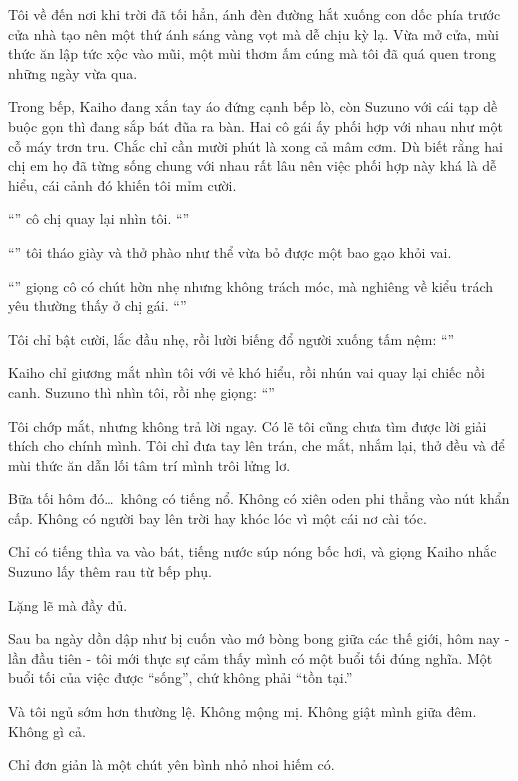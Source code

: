 \documentclass[../main.tex]{subfiles}
\begin{document}
Tôi về đến nơi khi trời đã tối hẳn, ánh đèn đường hắt xuống con dốc phía trước cửa nhà tạo nên một thứ ánh sáng vàng vọt mà dễ chịu kỳ lạ. Vừa mở cửa, mùi thức ăn lập tức xộc vào mũi, một mùi thơm ấm cúng mà tôi đã quá quen trong những ngày vừa qua.

Trong bếp, Kaiho đang xắn tay áo đứng cạnh bếp lò, còn Suzuno với cái tạp dề buộc gọn thì đang sắp bát đũa ra bàn. Hai cô gái ấy phối hợp với nhau như một cỗ máy trơn tru. Chắc chỉ cần mười phút là xong cả mâm cơm. Dù biết rằng hai chị em họ đã từng sống chung với nhau rất lâu nên việc phối hợp này khá là dễ hiểu, cái cảnh đó khiến tôi mỉm cười.

``'' cô chị quay lại nhìn tôi. ``''

``'' tôi tháo giày và thở phào như thể vừa bỏ được một bao gạo khỏi vai.

``'' giọng cô có chút hờn nhẹ nhưng không trách móc, mà nghiêng về kiểu trách yêu thường thấy ở chị gái. ``''

Tôi chỉ bật cười, lắc đầu nhẹ, rồi lười biếng đổ người xuống tấm nệm: ``''

Kaiho chỉ giương mắt nhìn tôi với vẻ khó hiểu, rồi nhún vai quay lại chiếc nồi canh. Suzuno thì nhìn tôi, rồi nhẹ giọng: ``''

Tôi chớp mắt, nhưng không trả lời ngay. Có lẽ tôi cũng chưa tìm được lời giải thích cho chính mình. Tôi chỉ đưa tay lên trán, che mắt, nhắm lại, thở đều và để mùi thức ăn dẫn lối tâm trí mình trôi lửng lơ.

Bữa tối hôm đó\dots\ không có tiếng nổ. Không có xiên oden phi thẳng vào nút khẩn cấp. Không có người bay lên trời hay khóc lóc vì một cái nơ cài tóc.

Chỉ có tiếng thìa va vào bát, tiếng nước súp nóng bốc hơi, và giọng Kaiho nhắc Suzuno lấy thêm rau từ bếp phụ.

Lặng lẽ mà đầy đủ.

Sau ba ngày dồn dập như bị cuốn vào mớ bòng bong giữa các thế giới, hôm nay - lần đầu tiên - tôi mới thực sự cảm thấy mình có một buổi tối đúng nghĩa. Một buổi tối của việc được ``sống'', chứ không phải ``tồn tại.''

Và tôi ngủ sớm hơn thường lệ. Không mộng mị. Không giật mình giữa đêm. Không gì cả.

Chỉ đơn giản là một chút yên bình nhỏ nhoi hiếm có.
\end{document}
